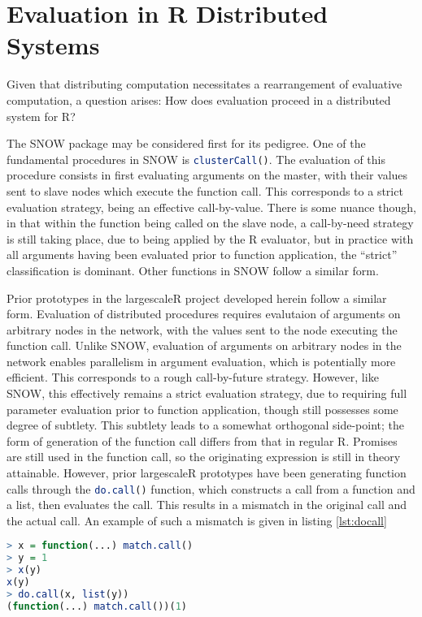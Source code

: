 \documentclass[10pt,a4paper]{article}
\begin{document}
\section{Evaluation in R Distributed Systems}\label{sec:rdisteval}

Given that distributing computation necessitates a rearrangement of evaluative computation, a question arises: How does evaluation proceed in a distributed system for R?

The SNOW package may be considered first for its pedigree.
One of the fundamental procedures in SNOW is \lstinline[language=R]{clusterCall()}\cite{tierney2018snow}.
The evaluation of this procedure consists in first evaluating arguments on the master, with their values sent to slave nodes which execute the function call.
This corresponds to a strict evaluation strategy, being an effective call-by-value.
There is some nuance though, in that within the function being called on the slave node, a call-by-need strategy is still taking place, due to being applied by the R evaluator, but in practice with all arguments having been evaluated prior to function application, the ``strict'' classification is dominant.
Other functions in SNOW follow a similar form.

Prior prototypes in the largescaleR project developed herein follow a similar form.
Evaluation of distributed procedures requires evalutaion of arguments on arbitrary nodes in the network, with the values sent to the node executing the function call.
Unlike SNOW, evaluation of arguments on arbitrary nodes in the network enables parallelism in argument evaluation, which is potentially more efficient.
This corresponds to a rough call-by-future strategy.
However, like SNOW, this effectively remains a strict evaluation strategy, due to requiring full parameter evaluation prior to function application, though still possesses some degree of subtlety.
This subtlety leads to a somewhat orthogonal side-point; the form of generation of the function call differs from that in regular R.
Promises are still used in the function call, so the originating expression is still in theory attainable.
However, prior largescaleR prototypes have been generating function calls through the \lstinline[language=R]{do.call()} function, which constructs a call from a function and a list, then evaluates the call.
This results in a mismatch in the original call and the actual call.
An example of such a mismatch is given in listing \ref{lst:docall}

\begin{lstlisting}[language=R,float,caption={A mismatch in an actual call and one generated with do.call},label=lst:docall]
> x = function(...) match.call()
> y = 1
> x(y)
x(y)
> do.call(x, list(y))
(function(...) match.call())(1)
\end{lstlisting}
\end{document}
